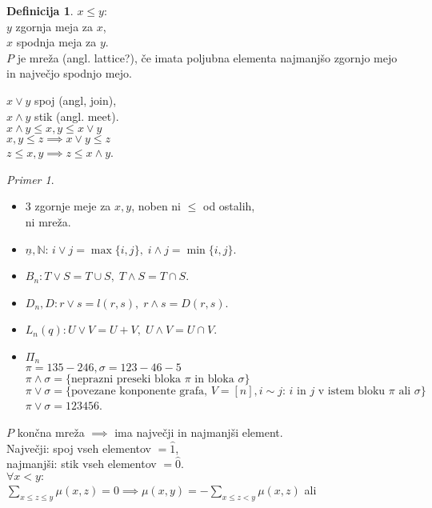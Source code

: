 \documentclass[a4paper, 12pt]{book}
\theoremstyle{definition}
\newtheorem{defn}[counter]{Definicija}
\theoremstyle{remark}
\newtheorem*{ex}{Primer}
\newcommand{\N}{\mathbb{N}}
\begin{document}
\begin{defn}
  $x \leq y$: \\
  $y$ zgornja meja za $x$, \\
  $x$ spodnja meja za $y$. \\
  $P$ je mreža (angl. lattice?), če imata poljubna elementa najmanjšo zgornjo mejo in največjo spodnjo mejo.
\end{defn}
$x \lor y$ spoj (angl, join), \\
$x \land y$ stik (angl. meet). \\
$x \land y \leq x, y \leq x \lor y$ \\
$x, y \leq z \implies x \lor y \leq z$ \\
$z \leq x, y \implies z \leq x \land y$.
\begin{ex} \text{} \\
  \begin{itemize}
    \item 3 zgornje meje za $x, y$, noben ni $\leq$ od ostalih, \\
      ni mreža.
    \item $\underline{n}, \N$: $i \lor j = \max \{i, j\}, \; i \land j = \min \{i, j\}$.
    \item $B_n: T \lor S = T \cup S, \; T \land S = T \cap S$.
    \item $D_n, D: r \lor s = l(r, s), \; r \land s = D(r, s)$.
    \item $L_n(q): U \lor V = U + V, \; U \land V = U \cap V$. \\
    \item $\Pi_n$ \\
      $\pi = 135-246, \sigma = 123-46-5$ \\
      $\pi \land \sigma = \{\text{neprazni preseki bloka $\pi$ in bloka $\sigma$}\}$ \\
      $\pi \lor \sigma = \{\text{povezane konponente grafa, $V = [n], i \sim j$:
        $i$ in $j$ v istem bloku $\pi$ ali $\sigma$}\}$
      $\pi \lor \sigma = 123456$.
  \end{itemize}
\end{ex}
$P$ končna mreža $\implies$ ima največji in najmanjši element. \\
Največji: spoj vseh elementov $= \hat{1}$, \\
najmanjši: stik vseh elementov $= \hat{0}$. \\
$\forall x < y:$ \\
$\sum_{x \leq z \leq y} \mu(x, z) = 0 \implies \mu(x, y) = - \sum_{x \leq z < y} \mu(x, z)$ ali \\
\end{document}

